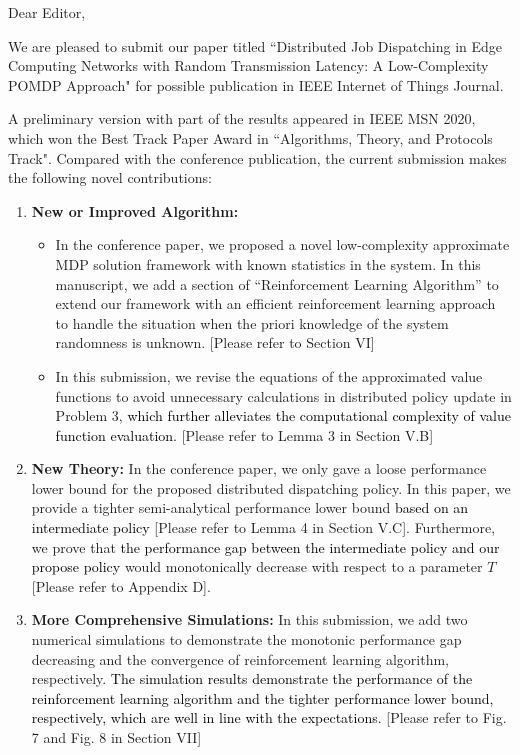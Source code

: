 \documentclass[10pt,draftclsnofoot,onecolumn]{article}
\newcommand{\tann}[1]{\textcolor{black}{#1}}
\begin{document}
Dear Editor,

We are pleased to submit our paper titled ``Distributed Job Dispatching in Edge Computing Networks with Random Transmission Latency: A Low-Complexity POMDP Approach" for possible publication in IEEE Internet of Things Journal.

A preliminary version with part of the results appeared in IEEE MSN 2020, which won the Best Track Paper Award in ``Algorithms, Theory, and Protocols Track". Compared with the conference publication, the current submission makes the following novel contributions:

\begin{enumerate}
\item \textbf{New or Improved Algorithm: }
\begin{itemize}
    \item In the conference paper, we proposed a novel low-complexity approximate MDP solution framework with known statistics in the system.
    In this manuscript, we add a section of ``Reinforcement Learning Algorithm'' to extend our framework with an efficient reinforcement learning approach to handle the situation when the priori knowledge of the system randomness is unknown. [Please refer to Section VI]
    \item In this submission, we revise the equations of the approximated value functions to avoid unnecessary calculations in distributed policy update in Problem 3, \tann{which further alleviates the computational complexity of value function evaluation.} [Please refer to Lemma 3 in Section V.B]
\end{itemize}

\item \textbf{New Theory:}
In the conference paper, we only gave a loose performance lower bound for the proposed distributed dispatching policy. In this paper, we provide a tighter semi-analytical performance lower bound \tann{based on an intermediate policy} [Please refer to Lemma 4 in Section V.C]. Furthermore, we prove that \tann{the performance gap between the intermediate policy and our propose policy} would monotonically decrease with respect to a parameter $T$ [Please refer to Appendix D].

\item \textbf{More Comprehensive Simulations:}
In this submission, we add two numerical simulations to demonstrate the monotonic performance gap decreasing and the convergence of reinforcement learning algorithm, respectively. \tann{The simulation results demonstrate the performance of the reinforcement learning algorithm and the tighter performance lower bound, respectively, which are well in line with the expectations.} [Please refer to Fig. 7 and Fig. 8 in Section VII]


\end{enumerate}
\end{document}
